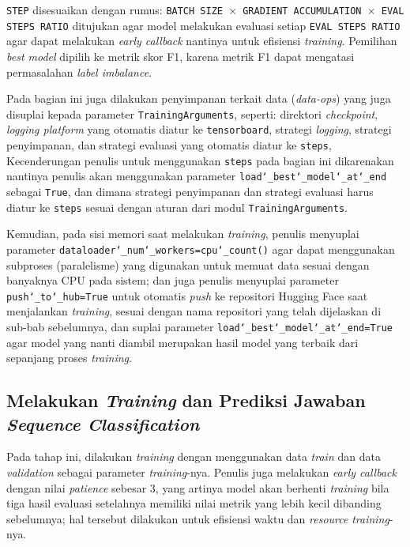 \texttt{STEP} disesuaikan dengan rumus: \texttt{BATCH SIZE $\times$ GRADIENT ACCUMULATION $\times$ EVAL STEPS RATIO} ditujukan agar model melakukan evaluasi setiap \texttt{EVAL STEPS RATIO} agar dapat melakukan \emph{early callback} nantinya untuk efisiensi \emph{training}. Pemilihan \emph{best model} dipilih ke metrik skor F1, karena metrik F1 dapat mengatasi permasalahan \emph{label imbalance}.

Pada bagian ini juga dilakukan penyimpanan terkait data (\emph{data-ops}) yang juga disuplai kepada parameter \texttt{TrainingArguments}, seperti: direktori \emph{checkpoint}, \emph{logging platform} yang otomatis diatur ke \texttt{tensorboard}, strategi \emph{logging}, strategi penyimpanan, dan strategi evaluasi yang otomatis diatur ke \texttt{steps}, Kecenderungan penulis untuk menggunakan \texttt{steps} pada bagian ini dikarenakan nantinya penulis akan menggunakan parameter \texttt{load\char`_best\char`_model\char`_at\char`_end} sebagai \texttt{True}, dan dimana strategi penyimpanan dan strategi evaluasi harus diatur ke \texttt{steps} sesuai dengan aturan dari modul \texttt{TrainingArguments}.

Kemudian, pada sisi memori saat melakukan \emph{training}, penulis menyuplai parameter \texttt{dataloader\char`_num\char`_workers=cpu\char`_count()} agar dapat menggunakan subproses (paralelisme) yang digunakan untuk memuat data sesuai dengan banyaknya CPU pada sistem; dan juga penulis menyuplai parameter \texttt{push\char`_to\char`_hub=True} untuk otomatis \emph{push} ke repositori Hugging Face saat menjalankan \emph{training}, sesuai dengan nama repositori yang telah dijelaskan di sub-bab sebelumnya, dan suplai parameter \texttt{load\char`_best\char`_model\char`_at\char`_end=True} agar model yang nanti diambil merupakan hasil model yang terbaik dari sepanjang proses \emph{training}.

\subsection{Melakukan \emph{Training} dan Prediksi Jawaban \emph{Sequence Classification}}
Pada tahap ini, dilakukan \emph{training} dengan menggunakan data \emph{train} dan data \emph{validation} sebagai parameter \emph{training}-nya. Penulis juga melakukan \emph{early callback} dengan nilai \emph{patience} sebesar 3, yang artinya model akan berhenti \emph{training} bila tiga hasil evaluasi setelahnya memiliki nilai metrik yang lebih kecil dibanding sebelumnya; hal tersebut dilakukan untuk efisiensi waktu dan \emph{resource} \emph{training}-nya. 

